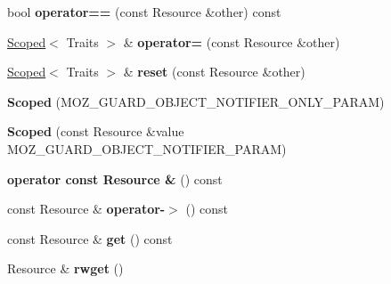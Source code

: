 \begin{DoxyCompactItemize}
\item 
\hypertarget{classmozilla_1_1_scoped_a7030efe727cc35d0b3a2c7bf19e996a3}{bool {\bfseries operator==} (const Resource \&other) const }\label{classmozilla_1_1_scoped_a7030efe727cc35d0b3a2c7bf19e996a3}

\item 
\hypertarget{classmozilla_1_1_scoped_a06ffec76adbfefad7d618be78690eb91}{\hyperlink{classmozilla_1_1_scoped}{Scoped}$<$ Traits $>$ \& {\bfseries operator=} (const Resource \&other)}\label{classmozilla_1_1_scoped_a06ffec76adbfefad7d618be78690eb91}

\item 
\hypertarget{classmozilla_1_1_scoped_a80fc9ba7d29914e5b46cd833da4f1b4e}{\hyperlink{classmozilla_1_1_scoped}{Scoped}$<$ Traits $>$ \& {\bfseries reset} (const Resource \&other)}\label{classmozilla_1_1_scoped_a80fc9ba7d29914e5b46cd833da4f1b4e}

\item 
\hypertarget{classmozilla_1_1_scoped_a2b8514619b6ae91168306d5c18a8c9fe}{{\bfseries Scoped} (M\-O\-Z\-\_\-\-G\-U\-A\-R\-D\-\_\-\-O\-B\-J\-E\-C\-T\-\_\-\-N\-O\-T\-I\-F\-I\-E\-R\-\_\-\-O\-N\-L\-Y\-\_\-\-P\-A\-R\-A\-M)}\label{classmozilla_1_1_scoped_a2b8514619b6ae91168306d5c18a8c9fe}

\item 
\hypertarget{classmozilla_1_1_scoped_ad0830659fb60460bfeba55c4d7945de7}{{\bfseries Scoped} (const Resource \&value M\-O\-Z\-\_\-\-G\-U\-A\-R\-D\-\_\-\-O\-B\-J\-E\-C\-T\-\_\-\-N\-O\-T\-I\-F\-I\-E\-R\-\_\-\-P\-A\-R\-A\-M)}\label{classmozilla_1_1_scoped_ad0830659fb60460bfeba55c4d7945de7}

\item 
\hypertarget{classmozilla_1_1_scoped_a7ee3e27ca3f2afd2f161b3206b1d310f}{{\bfseries operator const Resource \&} () const }\label{classmozilla_1_1_scoped_a7ee3e27ca3f2afd2f161b3206b1d310f}

\item 
\hypertarget{classmozilla_1_1_scoped_ab3a315f401dcdc66ed184b6747d157ee}{const Resource \& {\bfseries operator-\/$>$} () const }\label{classmozilla_1_1_scoped_ab3a315f401dcdc66ed184b6747d157ee}

\item 
\hypertarget{classmozilla_1_1_scoped_ae812a5fb56e9b5948fa3db0a36c42f3a}{const Resource \& {\bfseries get} () const }\label{classmozilla_1_1_scoped_ae812a5fb56e9b5948fa3db0a36c42f3a}

\item 
\hypertarget{classmozilla_1_1_scoped_ab0ae6cd041849c5957dee8cfe9ff912a}{Resource \& {\bfseries rwget} ()}\label{classmozilla_1_1_scoped_ab0ae6cd041849c5957dee8cfe9ff912a}


\end{DoxyCompactItemize}
